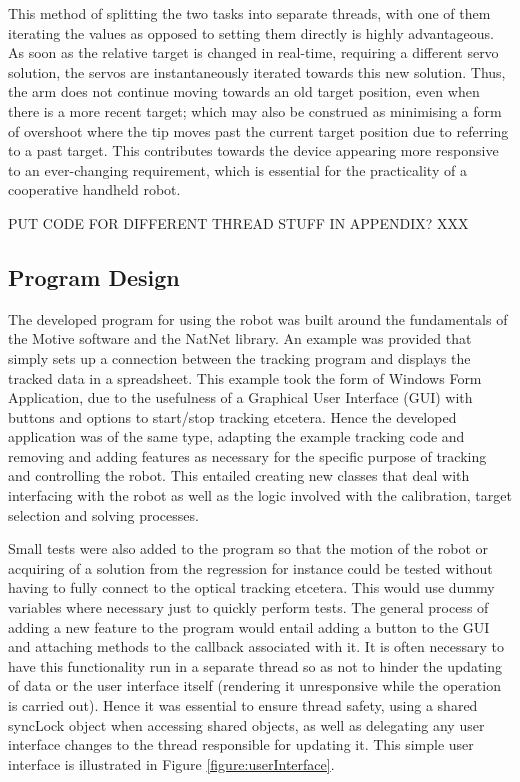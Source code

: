 \documentclass[11pt]{article}
\begin{document}
This method of splitting the two tasks into separate threads, with one of them iterating the values as opposed to setting them directly is highly advantageous. As soon as the relative target is changed in real-time, requiring a different servo solution, the servos are instantaneously iterated towards this new solution. Thus, the arm does not continue moving towards an old target position, even when there is a more recent target; which may also be construed as minimising a form of overshoot where the tip moves past the current target position due to referring to a past target. This contributes towards the device appearing more responsive to an ever-changing requirement, which is essential for the practicality of a cooperative handheld robot. 

PUT CODE FOR DIFFERENT THREAD STUFF IN APPENDIX? XXX


\pagebreak
\subsection{Program Design}
The developed program for using the robot was built around the fundamentals of the Motive software and the NatNet library. An example was provided that simply sets up a connection between the tracking program and displays the tracked data in a spreadsheet. This example took the form of Windows Form Application, due to the usefulness of a Graphical User Interface (GUI) with buttons and options to start/stop tracking etcetera. Hence the developed application was of the same type, adapting the example tracking code and removing and adding features as necessary for the specific purpose of tracking and controlling the robot. This entailed creating new classes that deal with interfacing with the robot as well as the logic involved with the calibration, target selection and solving processes. 

Small tests were also added to the program so that the motion of the robot or acquiring of a solution from the regression for instance could be tested without having to fully connect to the optical tracking etcetera. This would use dummy variables where necessary just to quickly perform tests. The general process of adding a new feature to the program would entail adding a button to the GUI and attaching methods to the callback associated with it. It is often necessary to have this functionality run in a separate thread so as not to hinder the updating of data or the user interface itself (rendering it unresponsive while the operation is carried out). Hence it was essential to ensure thread safety, using a shared syncLock object when accessing shared objects, as well as delegating any user interface changes to the thread responsible for updating it. This simple user interface is illustrated in Figure \ref{figure:userInterface}.
\end{document}
